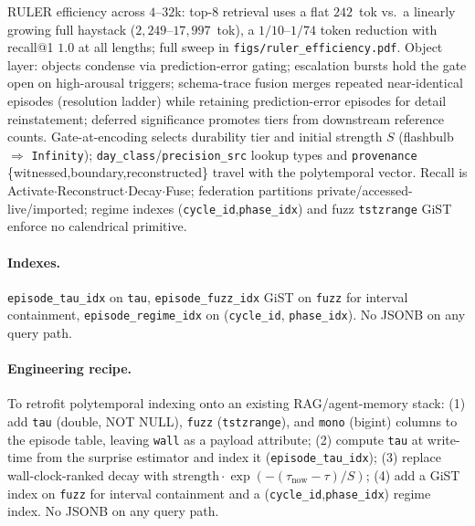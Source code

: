 RULER efficiency across $4$--$32$k: top-8 retrieval uses a flat $242$~tok vs.\ a linearly growing full haystack ($2{,}249$--$17{,}997$~tok), a $1/10$--$1/74$ token reduction with recall@1 $1.0$ at all lengths; full sweep in \texttt{figs/ruler\_efficiency.pdf}. Object layer: objects condense via prediction-error gating; escalation bursts hold the gate open on high-arousal triggers; schema-trace fusion merges repeated near-identical episodes (resolution ladder) while retaining prediction-error episodes for detail reinstatement; deferred significance promotes tiers from downstream reference counts. Gate-at-encoding selects durability tier and initial strength $S$ (flashbulb $\Rightarrow$ \texttt{Infinity}); \texttt{day\_class}/\texttt{precision\_src} lookup types and \texttt{provenance} \{witnessed,boundary,reconstructed\} travel with the polytemporal vector. Recall is Activate$\cdot$Reconstruct$\cdot$Decay$\cdot$Fuse; federation partitions private/accessed-live/imported; regime indexes (\texttt{cycle\_id},\texttt{phase\_idx}) and fuzz \texttt{tstzrange} GiST enforce no calendrical primitive.

\paragraph{Indexes.} \texttt{episode\_tau\_idx} on \texttt{tau}, \texttt{episode\_fuzz\_idx} GiST on \texttt{fuzz} for interval containment, \texttt{episode\_regime\_idx} on (\texttt{cycle\_id}, \texttt{phase\_idx}). No JSONB on any query path.

\paragraph{Engineering recipe.} To retrofit polytemporal indexing onto an existing RAG/agent-memory stack: (1) add \texttt{tau} (double, NOT NULL), \texttt{fuzz} (\texttt{tstzrange}), and \texttt{mono} (bigint) columns to the episode table, leaving \texttt{wall} as a payload attribute; (2) compute \texttt{tau} at write-time from the surprise estimator and index it (\texttt{episode\_tau\_idx}); (3) replace wall-clock-ranked decay with $\text{strength}\cdot\exp(-(\tau_{\text{now}}-\tau)/S)$; (4) add a GiST index on \texttt{fuzz} for interval containment and a (\texttt{cycle\_id},\texttt{phase\_idx}) regime index. No JSONB on any query path.